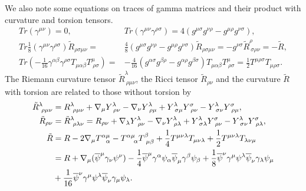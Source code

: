 We also note some equations on traces of gamma matrices and their product with curvature and torsion tensors. 
\begin{align}
Tr(\gamma^{\mu\nu}) = 0, \ \ & Tr(\gamma^{\mu\nu}\gamma^{\rho\sigma}) = 4(g^{\mu\sigma}g^{\nu\rho}-g^{\mu\rho}g^{\nu\sigma}), \\
Tr\frac{1}{8}(\gamma^{\mu\nu}\gamma^{\rho\sigma})\tilde{R}_{\rho\sigma\mu\nu} 
= & \frac{4}{8}(g^{\mu\sigma}g^{\nu\rho}-g^{\mu\rho}g^{\nu\sigma})\tilde{R}_{\rho\sigma\mu\nu}
=-g^{\nu\sigma}\tilde{R}^\rho_{\ \sigma\rho\nu}= -\tilde{R}, \label{gamma2R}\\
Tr(-\frac{1}{16}\gamma^{\alpha\beta}\gamma^{\rho\sigma}T_{\mu\alpha\beta}T^\mu_{\ \rho\sigma}) = &
-\frac{4}{16}(g^{\alpha\sigma}g^{\beta\rho}-g^{\alpha\rho}g^{\beta\sigma})T_{\mu\alpha\beta}T^\mu_{\ \rho\sigma}
=\frac{1}{2}T^{\mu\rho\sigma}T_{\mu\rho\sigma}.
\end{align}
The Riemann curvature tensor $\tilde{R}^\lambda_{\ \rho\mu\nu}$, the Ricci tensor $\tilde{R}_{\rho\nu}$ and the 
curvature $\tilde{R}$ with torsion are related to those without torsion by
 \begin{align}
\tilde{R}^\lambda_{\ \rho\mu\nu} & = 
R^\lambda_{\ \rho\mu\nu}+\nabla_\mu Y^\lambda_{\ \rho\nu}-\nabla_\nu Y^\lambda_{\ \rho\mu}
+Y^\lambda_{\ \sigma\mu}Y^\sigma_{\ \rho\nu}-Y^\lambda_{\ \sigma\nu}Y^\sigma_{\ \rho\mu}, \label{tcurvet}\\
\tilde{R}_{\rho\nu} & =
\tilde{R}^\lambda_{\ \rho\lambda\nu} = R_{\rho\nu}+\nabla_\lambda Y^\lambda_{\ \rho\nu}-\nabla_\nu Y^\lambda_{\ \rho\lambda}
+Y^\lambda_{\ \sigma\lambda}Y^\sigma_{\ \rho\nu}-Y^\lambda_{\ \sigma\nu}Y^\sigma_{\ \rho\lambda}, \label{tRicci}\\
\tilde{R} & =R-2\nabla_\mu T^{\alpha\mu}_{\ \ \alpha}-T^{\alpha\mu}_{\ \ \ \alpha}T^\beta_{\ \mu\beta}
+\frac{1}{4}T^{\mu\nu\lambda}T_{\mu\nu\lambda}+\frac{1}{2}T^{\mu\nu\lambda}T_{\lambda\nu\mu} \nonumber \\
& = R + \nabla_\mu(\ovl{\psi}^\mu\gamma_\nu\psi^\nu)
-\frac{1}{4}\ovl{\psi}^\mu\gamma^\alpha\psi_\alpha\ovl{\psi}_\mu\gamma^\beta\psi_\beta
+\frac{1}{8}\ovl{\psi}^\nu\gamma^\mu\psi^\lambda\ovl{\psi}_\nu\gamma_\lambda\psi_\mu 
\nonumber \\
& + \frac{1}{16}\ovl{\psi}^\nu\gamma^\mu\psi^\lambda\ovl{\psi}_\nu\gamma_\mu\psi_\lambda. \label{tcurve}
\end{align} 
\renewcommand{\theequation}{B.\arabic{equation}}
\setcounter{equation}{0}
